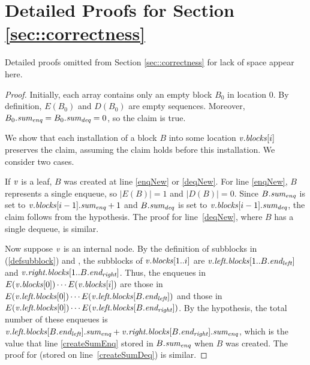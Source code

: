 
\section{Detailed Proofs for Section \ref{sec::correctness}}
\label{app::tracingDetails}

Detailed proofs omitted from Section \ref{sec::correctness} for lack of space appear here.

\sumRes*
\begin{proof}
Initially, each  array  contains only an empty block $B_0$ in location 0.
By definition, $E(B_0)$ and $D(B_0)$ are empty sequences.
Moreover, $B_0.\mbox{\textit{sum\textsubscript{enq}}} = B_0.\mbox{\textit{sum\textsubscript{deq}}} = 0$, so the claim is true.

We show that each installation of a block $B$ into some location $\mbox{\textnormal{\textit{v}}}.\mbox{\textit{blocks}}[i]$ preserves the claim,
assuming the claim holds before this installation.  We consider two cases.

If $\mbox{\textnormal{\textit{v}}}$ is a leaf, $B$ was created at line \ref{enqNew} or \ref{deqNew}.
For line \ref{enqNew}, $B$ represents a single enqueue, so $|E(B)|=1$ and $|D(B)|=0$.
Since $B.\mbox{\textit{sum\textsubscript{enq}}}$ is set to $\mbox{\textnormal{\textit{v}}}.\mbox{\textit{blocks}}[i-1].\mbox{\textit{sum\textsubscript{enq}}}+1$ and
$B.\mbox{\textit{sum\textsubscript{deq}}}$ is set to $\mbox{\textnormal{\textit{v}}}.\mbox{\textit{blocks}}[i-1].\mbox{\textit{sum\textsubscript{deq}}}$, the claim follows from the hypothesis.
The proof for line~\ref{deqNew}, where $B$ has a single dequeue, is similar.

Now suppose $\mbox{\textnormal{\textit{v}}}$ is an internal node. By the definition of subblocks in (\ref{defsubblock}) and , the
subblocks of $\mbox{\textnormal{\textit{v}}}.\mbox{\textit{blocks}}[1..i]$ are $\mbox{\textnormal{\textit{v}}}.\mbox{\textit{left.blocks}}[1..B.\mbox{\textit{end\textsubscript{left}}}]$ 
and $\mbox{\textnormal{\textit{v}}}.\mbox{\textit{right.blocks}}[1..B.\mbox{\textit{end\textsubscript{right}}}]$.
Thus, the enqueues in $E(\mbox{\textnormal{\textit{v}}}.\mbox{\textit{blocks}}[0])\cdots E(\mbox{\textnormal{\textit{v}}}.\mbox{\textit{blocks}}[i])$ are those in\linebreak
$E(\mbox{\textnormal{\textit{v}}}.\mbox{\textit{left.blocks}}[0]) \cdots E(\mbox{\textnormal{\textit{v}}}.\mbox{\textit{left.blocks}}[B.\mbox{\textit{end\textsubscript{left}}}])$ and those in \linebreak
$E(\mbox{\textnormal{\textit{v}}}.\mbox{\textit{left.blocks}}[0]) \cdots E(\mbox{\textnormal{\textit{v}}}.\mbox{\textit{left.blocks}}[B.\mbox{\textit{end\textsubscript{right}}}])$.
By the hypothesis, the total number of these enqueues is \linebreak
$\mbox{\textnormal{\textit{v}}}.\mbox{\textit{left.blocks}}[B.\mbox{\textit{end\textsubscript{left}}}].\mbox{\textit{sum\textsubscript{enq}}} + \mbox{\textnormal{\textit{v}}}.\mbox{\textit{right.blocks}}[B.\mbox{\textit{end\textsubscript{right}}}].\mbox{\textit{sum\textsubscript{enq}}}$, \linebreak
which is the value that line \ref{createSumEnq} stored in $B.\mbox{\textit{sum\textsubscript{enq}}}$ when $B$ was created.
The proof for  (stored on line~\ref{createSumDeq}) is similar.
\end{proof}

